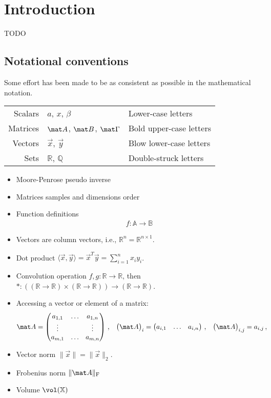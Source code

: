\chapter{Introduction}

TODO

\section{Notational conventions}

Some effort has been made to be as consistent as possible in the mathematical notation.

\begin{tabular}{r l l}
	Scalars & $a$, $x$, $\beta$ & Lower-case letters \\
	Matrices & $\mat A$, $\mat B$, $\mat \Gamma$ & Bold upper-case letters \\
	Vectors & $\vec x$, $\vec y$ & Blow lower-case letters \\
	Sets & $\mathbb{R}$, $\mathbb{Q}$ & Double-struck letters
\end{tabular}

\begin{itemize}
	\item Moore-Penrose pseudo inverse
	\item Matrices samples and dimensions order
	\item Function definitions
	\begin{align*}
		f : \mathbb{A} \longrightarrow \mathbb{B}
	\end{align*}
	\item Vectors are column vectors, i.e., $\mathbb{R}^{n} = \mathbb{R}^{n \times 1}$.
	\item Dot product $\langle \vec x, \vec y \rangle = \vec x^T \vec y = \sum_{i = 1}^n x_i y_i$.
	\item Convolution operation $f, g : \mathbb{R} \longrightarrow \mathbb{R}$, then $\ast : ((\mathbb{R} \longrightarrow \mathbb{R}) \times (\mathbb{R} \longrightarrow \mathbb{R})) \longrightarrow (\mathbb{R} \longrightarrow \mathbb{R})$.
	\item Accessing a vector or element of a matrix:
	\begin{align*}
		\mat A &= \begin{pmatrix}
			a_{1, 1} & \ldots & a_{1, n} \\
			\vdots & & \vdots  \\
			a_{m, 1} & \ldots & a_{m, n}
		\end{pmatrix} \,, &
		\big(\mat A\big)_i &= \begin{pmatrix}
			a_{i, 1} & \ldots &	a_{i, n}
		\end{pmatrix} \,, &
		\big(\mat A\big)_{i, j} &= a_{i, j} \,,
	\end{align*}
	\item Vector norm $\|\vec x\| = \|\vec x\|_2$.
	\item Frobenius norm $\|\mat A\|_\mathrm{F}$
	\item Volume $\vol(\mathbb{X})$
\end{itemize}